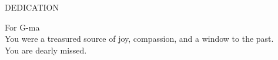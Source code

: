 \begin{center}
DEDICATION

\hspace{15cm}

For G-ma\\ You were a treasured source of joy, compassion, and a window to the past.\\
You are dearly missed.

\end{center}
